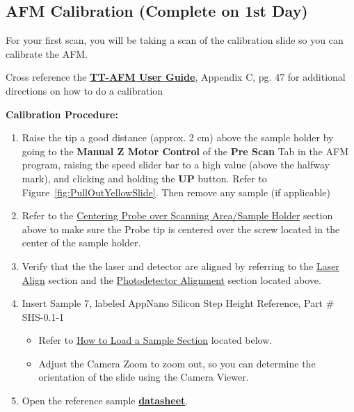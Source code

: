 \documentclass{../lab}
\begin{document}
\subsection{AFM Calibration (Complete on 1st Day)}

For your first scan, you will be taking a scan of the calibration slide so you can calibrate the AFM.

Cross reference the \href{http://experimentationlab.berkeley.edu/sites/default/files/AFMImages/TT_AFM\%20User-Guide-V2.2-600DPI.pdf}{\textbf{TT-AFM User Guide}}, Appendix C, pg. 47 for additional directions on how to do a calibration

\textbf{Calibration Procedure:}

\begin{enumerate}
    \item Raise the tip a good distance (approx. 2 cm) above the sample holder by going to the \textbf{Manual Z Motor Control} of the \textbf{Pre Scan} Tab in the AFM program, raising the speed slider bar to a high value (above the halfway mark), and clicking and holding the \textbf{UP }button.  Refer to Figure~\ref{fig:PullOutYellowSlide}.  Then remove any sample (if applicable)

    \item Refer to the \hyperref[sec:Alignment]{Centering Probe over Scanning Area/Sample Holder} section above to make sure the Probe tip is centered over the screw located in the center of the sample holder.

    \item Verify that the the laser and detector are aligned by referring to the \hyperref[subsec:LaserAlign]{Laser Align} section and the \hyperref[subsec:PhotodetectorAlignment]{Photodetector Alignment} section located above.

    \item Insert Sample 7, labeled AppNano Silicon Step Height Reference, Part \# SHS-0.1-1

    \begin{itemize}
        \item Refer to \hyperref[subsec:HowToLoadASample]{How to Load a Sample Section} located below.

        \item Adjust the Camera Zoom to zoom out, so you can determine the orientation of the slide using the Camera Viewer.
    \end{itemize}

    \item Open the reference sample \href{http://experimentationlab.berkeley.edu/sites/default/files/AFMImages/Reference-\%20sample-SHS-01\_3\_datasheet.pdf}{\textbf{datasheet}}.


\end{enumerate}
\end{document}
